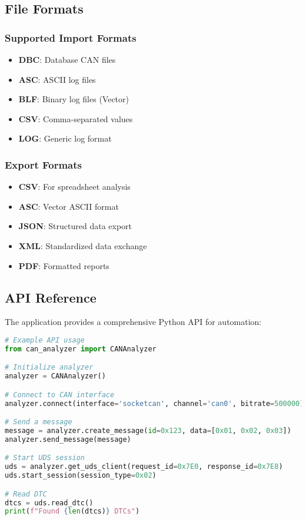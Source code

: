 \documentclass[11pt,a4paper]{article}
\begin{document}
\subsection{File Formats}

\subsubsection{Supported Import Formats}

\begin{itemize}
    \item \textbf{DBC}: Database CAN files
    \item \textbf{ASC}: ASCII log files
    \item \textbf{BLF}: Binary log files (Vector)
    \item \textbf{CSV}: Comma-separated values
    \item \textbf{LOG}: Generic log format
\end{itemize}

\subsubsection{Export Formats}

\begin{itemize}
    \item \textbf{CSV}: For spreadsheet analysis
    \item \textbf{ASC}: Vector ASCII format
    \item \textbf{JSON}: Structured data export
    \item \textbf{XML}: Standardized data exchange
    \item \textbf{PDF}: Formatted reports
\end{itemize}

\subsection{API Reference}

The application provides a comprehensive Python API for automation:

\begin{lstlisting}[language=python]
# Example API usage
from can_analyzer import CANAnalyzer

# Initialize analyzer
analyzer = CANAnalyzer()

# Connect to CAN interface
analyzer.connect(interface='socketcan', channel='can0', bitrate=500000)

# Send a message
message = analyzer.create_message(id=0x123, data=[0x01, 0x02, 0x03])
analyzer.send_message(message)

# Start UDS session
uds = analyzer.get_uds_client(request_id=0x7E0, response_id=0x7E8)
uds.start_session(session_type=0x02)

# Read DTC
dtcs = uds.read_dtc()
print(f"Found {len(dtcs)} DTCs")
\end{lstlisting}
\end{document}
